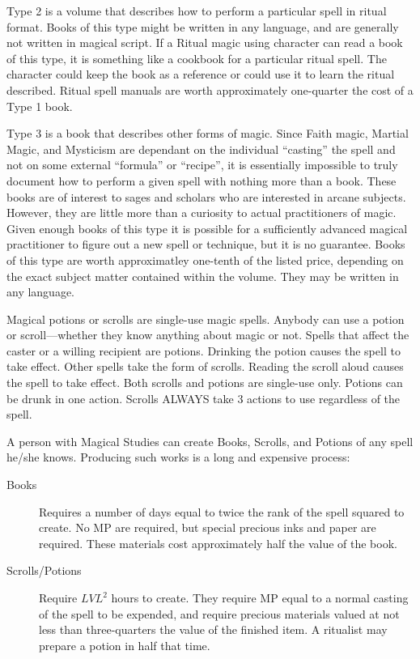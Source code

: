 Type 2 is a volume that describes how to perform a particular spell in
ritual format.  Books of this type might be written in any language,
and are generally not written in magical script.  If a Ritual magic
using character can read a book of this type, it is something like a
cookbook for a particular ritual spell.  The character could keep the
book as a reference or could use it to learn the ritual described.
Ritual spell manuals are worth approximately one-quarter the cost of a
Type 1 book.

Type 3 is a book that describes other forms of magic.  Since Faith
magic, Martial Magic, and Mysticism are dependant on the individual
``casting'' the spell and not on some external ``formula'' or
``recipe'', it is essentially impossible to truly document how to
perform a given spell with nothing more than a book.  These books are
of interest to sages and scholars who are interested in arcane
subjects.  However, they are little more than a curiosity to actual
practitioners of magic.  Given enough books of this type it is
possible for a sufficiently advanced magical practitioner to figure
out a new spell or technique, but it is no guarantee.  Books of this
type are worth approximatley one-tenth of the listed price, depending
on the exact subject matter contained within the volume.  They may be
written in any language.

Magical potions or scrolls are single-use magic spells.  Anybody can
use a potion or scroll---whether they know anything about magic or
not.  Spells that affect the caster or a willing recipient are
potions.  Drinking the potion causes the spell to take effect.  Other
spells take the form of scrolls.  Reading the scroll aloud causes the
spell to take effect.  Both scrolls and potions are single-use only.
Potions can be drunk in one action.  Scrolls ALWAYS take 3 actions to
use regardless of the spell.

A person with Magical Studies can create Books, Scrolls, and Potions
of any spell he/she knows.  Producing such works is a long and
expensive process:

\begin{description}
\item[Books] Requires a number of days equal to twice the rank of the
  spell squared to create.  No MP are required, but special precious
  inks and paper are required.  These materials cost approximately
  half the value of the book.

\item[Scrolls/Potions] Require $LVL^2$ hours to create.  They require
  MP equal to a normal casting of the spell to be expended, and
  require precious materials valued at not less than three-quarters
  the value of the finished item.  A ritualist may prepare a potion in
  half that time.
\end{description}

